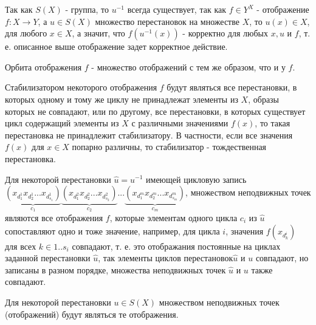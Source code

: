 \documentclass[a4paper,12pt]{article}
\begin{document}
\begin{Solution}
Так как $S\left(X\right)$ - группа, то $u^{-1}$ всегда существует, так как $f \in Y^X$ - отображение $f : X \rightarrow Y$, а $u \in S\left(X\right)$ множество перестановок на множестве $X$, то $u\left(x\right) \in X$, для любого $x \in X$, а значит, что $f\left(u^{-1}\left(x\right)\right)$ - корректно для любых $x, u$ и $f$, т. е. описанное выше отображение задет корректное действие.

Орбита отображения $f$ - множество отображений с тем же образом, что и у $f$.

Стабилизатором некоторого отображения $f$ будут являться все перестановки, в которых одному и тому же циклу не принадлежат элементы из $X$, образы которых не совпадают, или по другому, все перестановки, в которых существует цикл содержащий элементы из $X$ с различными значениями $f\left(x\right)$, то такая перестановка не принадлежит стабилизатору. В частности, если все значения $f\left(x\right)$ для $x \in X$ попарно различны, то стабилизатор - тождественная перестановка.

Для некоторой перестановки $\hat u = u^{-1}$ имеющей цикловую запись $\underbrace{\left(x_{d^1_1}x_{d^1_2}...x_{d^1_{s_1}}\right)}_{c_1}\underbrace{\left(x_{d^2_1}x_{d^2_2}...x_{d^2_{s_2}}\right)}_{c_2}...\underbrace{\left(x_{d^m_1}x_{d^m_2}...x_{d^m_{s_m}}\right)}_{c_m}$, множеством неподвижных точек являются все отображения $f$, которые элементам одного цикла $c_i$ из $\hat u$ сопоставляют одно и тоже значение, например, для цикла $i$, значения $f\left(x_{d^i_k}\right)$ для всех $k \in {1..s_i}$ совпадают, т. е. это отображания постоянные на циклах заданной перестановки $\hat u$, так элементы циклов перестановок$\hat u$ и $u$ совпадают, но записаны в разном порядке, множества неподвижных точек $\hat u$ и $u$ также совпадают.

Для некоторой перестановки $u \in S\left(X\right)$ множеством неподвижных точек (отображений) будут являться те отображения.
\end{Solution}
\end{document}
